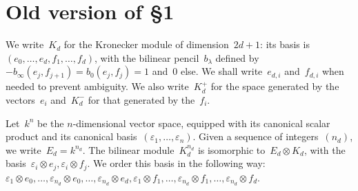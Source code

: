 \documentclass{article}
\begin{document}
% 
% 
% 
% 



\section{Old version of §1}

We write~$K_d$ for the Kronecker module of dimension~$2d+1$: its basis
is~$(e_0, …, e_d, f_1, …, f_d)$, with the bilinear pencil~$b_{λ}$ defined
by~$-b_{∞} (e_j, f_{j+1}) = b_{0} (e_j, f_j) = 1$ and~$0$ else. We shall
write~$e_{d,i}$ and~$f_{d,i}$ when needed to prevent ambiguity. We also
write~$K_d^+$ for the space generated by the vectors~$e_i$ and~$K_d^-$
for that generated by the~$f_i$.

Let~$k^n$ be the $n$-dimensional vector space, equipped with its
canonical scalar product and its canonical basis~$(ε_1, …, ε_n)$. Given a
sequence of integers~$(n_d)$, we write~$E_d = k^{n_d}$. The
bilinear module~$K_d^{n_d}$ is isomorphic to~$E_d ⊗ K_d$, with the basis~$ε_i ⊗
e_j, ε_i ⊗ f_j$. We order this basis in the following way: $ε_1 ⊗ e_0, …,
ε_{n_d} ⊗ e_0, …, ε_{n_d} ⊗ e_d, ε_1 ⊗ f_1, …, ε_{n_d} ⊗ f_1, …, ε_{n_d} ⊗ f_d$.
\end{document}
